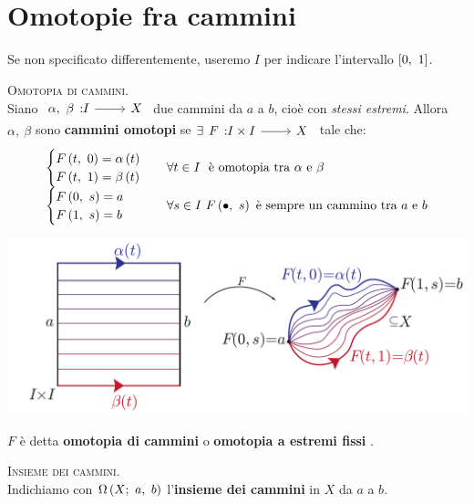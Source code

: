 \section{Omotopie fra cammini}
\begin{notate}
Se non specificato differentemente, useremo $I$ per indicare l'intervallo $\left[0,\ 1\right]$.
\end{notate}
\begin{define}\textsc{Omotopia di cammini.}\\
	Siano $\funz{\alpha,\ \beta}{I}{X}$ due cammini da $a$ a $b$, cioè con \textit{stessi estremi}. Allora $\alpha,\ \beta$ sono \textbf{cammini omotopi} se $\exists \funz{F}{I \times I}{X}$ tale che:
	\begin{equation}
		\begin{array}{ll}
			\begin{cases}
							F\left(t,\ 0\right)=\alpha\left(t\right)\\
				F\left(t,\ 1\right)=\beta\left(t\right)
			\end{cases}&
		\forall t\in I\ \text{ è omotopia tra } \alpha \text{ e }\beta\\
			\begin{cases}
			F\left(0,\ s\right)=a\\
			F\left(1,\ s\right)=b
		\end{cases}&
		\forall s\in I\ F\left(\bullet,\ s\right) \text{ è sempre un cammino tra } a \text{ e }b
		\end{array}
	\end{equation}
	\begin{center}
	\includegraphics[trim=0cm 0cm 0cm 0cm,clip,scale=0.4]{images/pathhomotopy.pdf}
\end{center}
$F$ è detta \textbf{omotopia di cammini} o \textbf{omotopia a estremi fissi} .
\end{define}
\begin{define}\textsc{Insieme dei cammini.}\\
	Indichiamo con $\Omega\left(X;\ a,\ b\right)$ l'\textbf{insieme dei cammini} in $X$ da $a$ a $b$.
\end{define}
